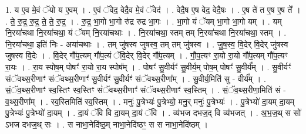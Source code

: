 \documentclass[17pt]{extarticle}
\begin{document}
1. य ए॒व मे॒वं ॅयो य ए॒वम् । . ए॒वं ॅवेद॒ वेदै॒व मे॒वं ॅवेद॑ । . वेदै॒ष ए॒ष वेद॒ वेदै॒षः । . ए॒ष ते॑ त ए॒ष ए॒ष ते᳚ । . ते॒ रु॒द्र॒ रु॒द्र॒ ते॒ ते॒ रु॒द्र॒ । . रु॒द्र॒ भा॒गो भा॒गो रु॑द्र रुद्र भा॒गः । . भा॒गो यं ॅयम् भा॒गो भा॒गो यम् । . यम् नि॒रया॑चथा नि॒रया॑चथा॒ यं ॅयम् नि॒रया॑चथाः । . नि॒रया॑चथा॒ स्तम् तम् नि॒रया॑चथा नि॒रया॑चथा॒ स्तम् । . नि॒रया॑चथा॒ इति॑ निः - अया॑चथाः । . तम् जु॑षस्व जुषस्व॒ तम् तम् जु॑षस्व । . जु॒ष॒स्व॒ वि॒देर् वि॒देर् जु॑षस्व जुषस्व वि॒देः । . वि॒देर् गौ॑प॒त्यम् गौ॑प॒त्यं ॅवि॒देर् वि॒देर् गौ॑प॒त्यम् । . गौ॒प॒त्यꣳ रा॒यो रा॒यो गौ॑प॒त्यम् गौ॑प॒त्यꣳ रा॒यः । . रा॒य स्पोष॒म् पोषꣳ॑ रा॒यो रा॒य स्पोष᳚म् । . पोषꣳ॑ सु॒वीर्यꣳ॑ सु॒वीर्य॒म् पोष॒म् पोषꣳ॑ सु॒वीर्य᳚म् । . सु॒वीर्यꣳ॑ संॅवथ्स॒रीणाꣳ॑ संॅवथ्स॒रीणाꣳ॑ सु॒वीर्यꣳ॑ सु॒वीर्यꣳ॑ संॅवथ्स॒रीणा᳚म् । . सु॒वीर्य॒मिति॑ सु - वीर्य᳚म् । . सं॒ॅव॒थ्स॒रीणाꣳ॑ स्व॒स्तिꣳ स्व॒स्तिꣳ सं॑ॅवथ्स॒रीणाꣳ॑ संॅवथ्स॒रीणाꣳ॑ स्व॒स्तिम् । . सं॒ॅव॒थ्स॒रीणा॒मिति॑ सं - व॒थ्स॒रीणा᳚म् । . स्व॒स्तिमिति॑ स्व॒स्तिम् । . मनुः॑ पु॒त्रेभ्यः॑ पु॒त्रेभ्यो॒ मनु॒र् मनुः॑ पु॒त्रेभ्यः॑ । . पु॒त्रेभ्यो॑ दा॒यम् दा॒यम् पु॒त्रेभ्यः॑ पु॒त्रेभ्यो॑ दा॒यम् । . दा॒यं ॅवि वि दा॒यम् दा॒यं ॅवि । . व्य॑भज दभज॒द् वि व्य॑भजत् । . अ॒भ॒ज॒थ् स सो॑ ऽभज दभज॒थ् सः । . स नाभा॒नेदि॑ष्ठ॒म् नाभा॒नेदि॑ष्ठꣳ॒॒ स स नाभा॒नेदि॑ष्ठम् । \newline
\end{document}
